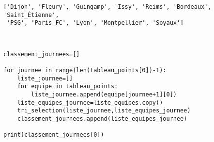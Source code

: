 \begin{enumerate}
\begin{verbatim}
['Dijon', 'Fleury', 'Guingamp', 'Issy', 'Reims', 'Bordeaux', 'Saint_Étienne',
 'PSG', 'Paris_FC', 'Lyon', 'Montpellier', 'Soyaux']
\end{verbatim}


\begin{solution}~\ \\
\begin{verbatim}
classement_journees=[]

for journee in range(len(tableau_points[0])-1):
    liste_journee=[]
    for equipe in tableau_points:
        liste_journee.append(equipe[journee+1][0])
    liste_equipes_journee=liste_equipes.copy()
    tri_selection(liste_journee,liste_equipes_journee)
    classement_journees.append(liste_equipes_journee)

print(classement_journees[0])
\end{verbatim}
\end{solution}


\end{enumerate}


